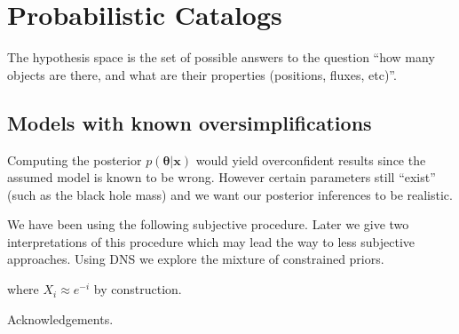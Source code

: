 \documentclass[
  ,final            %
  ]
  {aipproc}
\newcommand{\pars}{\boldsymbol{\theta}}
\newcommand{\data}{\mathbf{x}}
\begin{document}
\section{Probabilistic Catalogs}
The hypothesis space is the set of possible answers to the question
``how many objects are there, and what are their properties (positions, fluxes,
etc)''.



\subsection{Models with known oversimplifications}
Computing the posterior $p(\pars | \data)$ would yield overconfident results
since the assumed model is known to be wrong. However certain parameters still
``exist'' (such as the black hole mass) and we want our posterior inferences
to be realistic.

We have been using the following subjective procedure. Later we give two
interpretations of this procedure which may lead the way to less subjective
approaches.
Using DNS we explore the mixture of constrained priors.

where $X_i \approx e^{-i}$ by construction.


\begin{theacknowledgments}
Acknowledgements.
\end{theacknowledgments}


\end{document}
